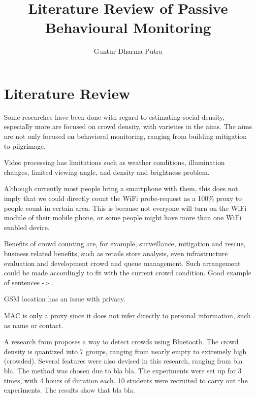 \documentclass{article}
\begin{document}
\title{Literature Review of Passive Behavioural Monitoring}
\author{Guntur Dharma Putra}

\maketitle


\section{Literature Review}
Some researches have been done with regard to estimating social density, especially more are focused on crowd density, with varieties in the aims. The aims are not only focused on behavioral monitoring, ranging from building mitigation to pilgrimage.

Video processing has limitations such as weather conditions, illumination changes, limited viewing angle, and density and brightness problem. 

Although currently most people bring a smartphone with them, this does not imply that we could directly count the WiFi probe-request as a 100\% proxy to people count in certain area. This is because not everyone will turn on the WiFi module of their mobile phone, or some people might have more than one WiFi enabled device.

Benefits of crowd counting are, for example, surveillance, mitigation and rescue, business related benefits, such as retails store analysis, even infrastructure evaluation and development crowd and queue management. Such arrangement could be made accordingly to fit with the current crowd condition. Good example of sentences -> \cite{thesis051}.

GSM location has an issue with privacy\cite{thesis017}.

MAC is only a proxy since it does not infer directly to personal information, such as name or contact.

A research from \cite{thesis008} proposes a way to detect crowds using Bluetooth. The crowd density is quantized into 7 groups, ranging from nearly empty to extremely high (crowded). Several features were also devised in this research, ranging from bla bla. 
The method was chosen due to bla bla.
The experiments were set up for 3 times, with 4 hours of duration each. 10 students were recruited to carry out the experiments.
The results show that bla bla.
\end{document}
